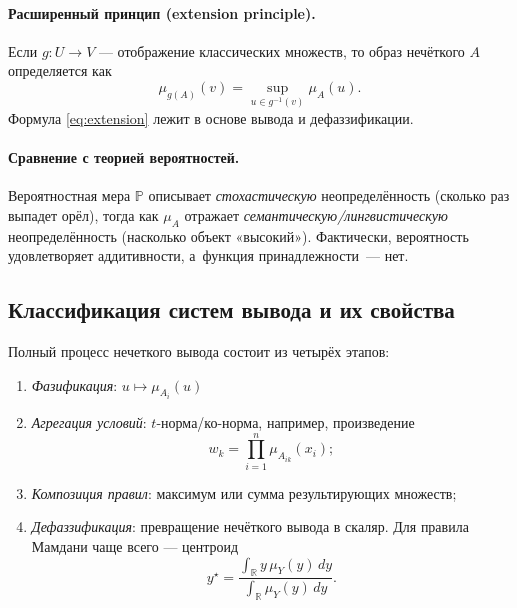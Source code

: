\paragraph{Расширенный принцип (extension principle).}
Если $g:U\to V$ — отображение классических множеств,
то образ нечёткого $A$ определяется как
\begin{equation}
  \mu_{g(A)}(v)=\sup_{u\in g^{-1}(v)} \mu_A(u).
  \label{eq:extension}
\end{equation}
Формула \eqref{eq:extension} лежит в основе вывода
и дефаззификации.

\paragraph{Сравнение с теорией вероятностей.}
Вероятностная мера $\mathbb P$ описывает
\emph{стохастическую} неопределённость
(сколько раз выпадет орёл),
тогда как $\mu_A$ отражает
\emph{семантическую/лингвистическую} неопределённость
(насколько объект «высокий»).
Фактически, вероятность удовлетворяет
аддитивности, а~функция принадлежности~— нет.

\subsection{Классификация систем вывода и их свойства}
\label{subsec:classification}

Полный процесс нечеткого вывода состоит из четырёх этапов:

\begin{enumerate}
  \item \emph{Фазификация}: $u\mapsto\mu_{A_i}(u)$
  \item \emph{Агрегация условий}: $t$-норма/ко-норма,
        например, произведение
        \begin{equation}
          w_k=\prod_{i=1}^{n}\mu_{A_{ik}}(x_i);
          \label{eq:tprod}
        \end{equation}
  \item \emph{Композиция правил}: максимум или сумма
        результирующих множеств;
  \item \emph{Дефаззификация}: превращение
        нечёткого вывода в скаляр.  
        Для правила Мамдани чаще всего —
        центроид
        \begin{equation}
          y^\star=\frac{\displaystyle
                     \int_{\mathbb R} y\,\mu_Y(y)\,dy}
                     {\displaystyle\int_{\mathbb R}\mu_Y(y)\,dy}.
          \label{eq:centroid}
        \end{equation}
\end{enumerate}

